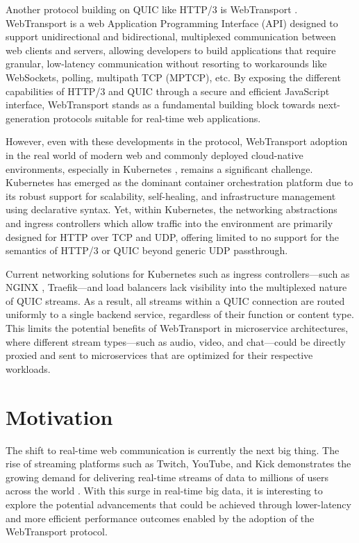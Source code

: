 Another protocol building on QUIC like HTTP/3 is WebTransport \cite{webtransport-draft}. WebTransport is a web Application Programming Interface (API) designed to support unidirectional and bidirectional, multiplexed communication between web clients and servers, allowing developers to build applications that require granular, low-latency communication without resorting to workarounds like WebSockets, polling, multipath TCP (MPTCP), etc. By exposing the different capabilities of HTTP/3 and QUIC through a secure and efficient JavaScript interface, WebTransport stands as a fundamental building block towards next-generation protocols suitable for real-time web applications.

However, even with these developments in the protocol, WebTransport adoption in the real world of modern web and commonly deployed cloud-native environments, especially in Kubernetes \cite{kubernetes-docs}, remains a significant challenge. Kubernetes has emerged as the dominant container orchestration platform due to its robust support for scalability, self-healing, and infrastructure management using declarative syntax. Yet, within Kubernetes, the networking abstractions and ingress controllers which allow traffic into the environment are primarily designed for HTTP over TCP and UDP, offering limited to no support for the semantics of HTTP/3 or QUIC beyond generic UDP passthrough.

Current networking solutions for Kubernetes such as ingress controllers—such as NGINX \cite{nginx-ingress-docs}, Traefik—and load balancers lack visibility into the multiplexed nature of QUIC streams. As a result, all streams within a QUIC connection are routed uniformly to a single backend service, regardless of their function or content type. This limits the potential benefits of WebTransport in microservice architectures, where different stream types—such as audio, video, and chat—could be directly proxied and sent to microservices that are optimized for their respective workloads.




\section{Motivation}

The shift to real-time web communication is currently the next big thing. The rise of streaming platforms such as Twitch, YouTube, and Kick demonstrates the growing demand for delivering real-time streams of data to millions of users across the world \cite{kreps2011}. With this surge in real-time big data, it is interesting to explore the potential advancements that could be achieved through lower-latency and more efficient performance outcomes enabled by the adoption of the WebTransport protocol.

